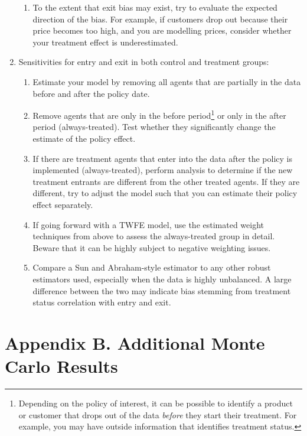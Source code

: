 \documentclass[12pt]{article}
\begin{document}
\begin{enumerate}
\begin{enumerate}
        \item To the extent that exit bias may exist, try to evaluate the expected direction of the bias. For example, if customers drop out because their price becomes too high, and you are modelling prices, consider whether your treatment effect is underestimated.
    \end{enumerate}
    \item Sensitivities for entry and exit in both control and treatment groups:
    \begin{enumerate}
        \item Estimate your model by removing all agents that are partially in the data before and after the policy date.
        \item Remove agents that are only in the before period\footnote{Depending on the policy of interest, it can be possible to identify a product or customer that drops out of the data \textit{before} they start their treatment. For example, you may have outside information that identifies treatment status.} or only in the after period (always-treated). Test whether they significantly change the estimate of the policy effect.
        \item If there are treatment agents that enter into the data after the policy is implemented (always-treated), perform analysis to determine if the new treatment entrants are different from the other treated agents. If they are different, try to adjust the model such that you can estimate their policy effect separately.
        \item If going forward with a TWFE model, use the estimated weight techniques from above to assess the always-treated group in detail. Beware that it can be highly subject to negative weighting issues.
        \item Compare a Sun and Abraham-style estimator to any other robust estimators used, especially when the data is highly unbalanced. A large difference between the two may indicate bias stemming from treatment status correlation with entry and exit.
    \end{enumerate}
\end{enumerate}
\newpage
\section*{Appendix B. Additional Monte Carlo Results} \label{sec:appendixb}
\end{document}

